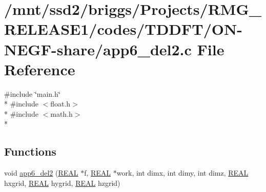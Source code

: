 \hypertarget{_t_d_d_f_t_2_o_n-_n_e_g_f-share_2app6__del2_8c}{\section{/mnt/ssd2/briggs/\-Projects/\-R\-M\-G\-\_\-\-R\-E\-L\-E\-A\-S\-E1/codes/\-T\-D\-D\-F\-T/\-O\-N-\/\-N\-E\-G\-F-\/share/app6\-\_\-del2.c File Reference}
\label{_t_d_d_f_t_2_o_n-_n_e_g_f-share_2app6__del2_8c}
}
{\ttfamily \#include \char`\"{}main.\-h\char`\"{}}\\*
{\ttfamily \#include $<$float.\-h$>$}\\*
{\ttfamily \#include $<$math.\-h$>$}\\*
\subsection*{Functions}
\begin{DoxyCompactItemize}
\item 
void \hyperlink{_t_d_d_f_t_2_o_n-_n_e_g_f-share_2app6__del2_8c_a92dcbcbf7c617839fbf4f78593248949}{app6\-\_\-del2} (\hyperlink{md_8h_a4b654506f18b8bfd61ad2a29a7e38c25}{R\-E\-A\-L} $\ast$f, \hyperlink{md_8h_a4b654506f18b8bfd61ad2a29a7e38c25}{R\-E\-A\-L} $\ast$work, int dimx, int dimy, int dimz, \hyperlink{md_8h_a4b654506f18b8bfd61ad2a29a7e38c25}{R\-E\-A\-L} hxgrid, \hyperlink{md_8h_a4b654506f18b8bfd61ad2a29a7e38c25}{R\-E\-A\-L} hygrid, \hyperlink{md_8h_a4b654506f18b8bfd61ad2a29a7e38c25}{R\-E\-A\-L} hzgrid)
\end{DoxyCompactItemize}


